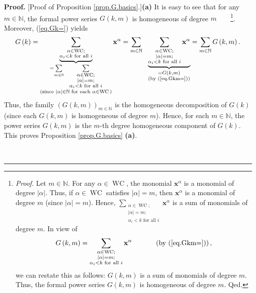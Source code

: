 \documentclass[numbers=enddot,12pt,final,onecolumn,notitlepage]{scrartcl}%
\theoremstyle{definition}
\newenvironment{proof}[1][Proof]{\noindent\textbf{#1.} }{\ \rule{0.5em}{0.5em}}
\let\sumnonlimits\sum
\renewcommand{\sum}{\sumnonlimits\limits}
\newenvironment{verlong}{}{}
\begin{document}
\begin{verlong}
\begin{proof}
[Proof of Proposition \ref{prop.G.basics}.]\textbf{(a)} It is easy to see that
for any $m\in\mathbb{N}$, the formal power series $G\left(  k,m\right)  $ is
homogeneous of degree $m$\ \ \ \ \footnote{\textit{Proof.} Let $m\in
\mathbb{N}$. For any $\alpha\in\operatorname*{WC}$, the monomial
$\mathbf{x}^{\alpha}$ is a monomial of degree $\left\vert \alpha\right\vert $.
Thus, if $\alpha\in\operatorname*{WC}$ satisfies $\left\vert \alpha\right\vert
=m$, then $\mathbf{x}^{\alpha}$ is a monomial of degree $m$ (since $\left\vert
\alpha\right\vert =m$). Hence, $\sum_{\substack{\alpha\in\operatorname*{WC}%
;\\\left\vert \alpha\right\vert =m;\\\alpha_{i}<k\text{ for all }i}%
}\mathbf{x}^{\alpha}$ is a sum of monomials of degree $m$. In view of
\[
G\left(  k,m\right)  =\sum_{\substack{\alpha\in\operatorname*{WC};\\\left\vert
\alpha\right\vert =m;\\\alpha_{i}<k\text{ for all }i}}\mathbf{x}^{\alpha
}\ \ \ \ \ \ \ \ \ \ \left(  \text{by (\ref{eq.Gkm=})}\right)  ,
\]
we can restate this as follows: $G\left(  k,m\right)  $ is a sum of monomials
of degree $m$. Thus, the formal power series $G\left(  k,m\right)  $ is
homogeneous of degree $m$. Qed.}. Moreover, (\ref{eq.Gk=}) yields%
\[
G\left(  k\right)  =\underbrace{\sum_{\substack{\alpha\in\operatorname*{WC}%
;\\\alpha_{i}<k\text{ for all }i}}}_{\substack{=\sum_{m\in\mathbb{N}}%
\ \ \sum_{\substack{\alpha\in\operatorname*{WC};\\\left\vert \alpha\right\vert
=m;\\\alpha_{i}<k\text{ for all }i}}\\\text{(since }\left\vert \alpha
\right\vert \in\mathbb{N}\text{ for each }\alpha\in\operatorname*{WC}\text{)}%
}}\mathbf{x}^{\alpha}=\sum_{m\in\mathbb{N}}\ \ \underbrace{\sum
_{\substack{\alpha\in\operatorname*{WC};\\\left\vert \alpha\right\vert
=m;\\\alpha_{i}<k\text{ for all }i}}\mathbf{x}^{\alpha}}_{\substack{=G\left(
k,m\right)  \\\text{(by (\ref{eq.Gkm=}))}}}=\sum_{m\in\mathbb{N}}G\left(
k,m\right)  .
\]
Thus, the family $\left(  G\left(  k,m\right)  \right)  _{m\in\mathbb{N}}$ is
the homogeneous decomposition of $G\left(  k\right)  $ (since each $G\left(
k,m\right)  $ is homogeneous of degree $m$). Hence, for each $m\in\mathbb{N}$,
the power series $G\left(  k,m\right)  $ is the $m$-th degree homogeneous
component of $G\left(  k\right)  $. This proves Proposition
\ref{prop.G.basics} \textbf{(a)}.


\end{proof}
\end{verlong}
\end{document}
